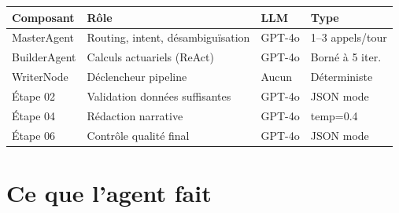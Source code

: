 \documentclass[12pt,a4paper]{article}
\begin{document}
\begin{center}
\begin{tabular}{llll}
\toprule
\textbf{Composant} & \textbf{Rôle} & \textbf{LLM} & \textbf{Type} \\
\midrule
MasterAgent    & Routing, intent, désambiguïsation & GPT-4o & 1–3 appels/tour \\
BuilderAgent   & Calculs actuariels (ReAct)        & GPT-4o & Borné à 5 iter. \\
WriterNode     & Déclencheur pipeline              & Aucun  & Déterministe \\
Étape 02       & Validation données suffisantes    & GPT-4o & JSON mode \\
Étape 04       & Rédaction narrative               & GPT-4o & temp=0.4 \\
Étape 06       & Contrôle qualité final            & GPT-4o & JSON mode \\
\bottomrule
\end{tabular}
\end{center}

\newpage

\section{Ce que l'agent fait}
\end{document}
